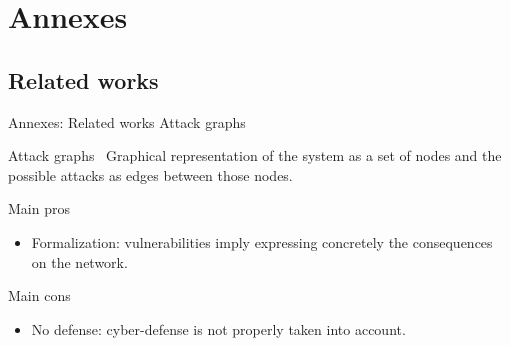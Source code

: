 \section{Annexes}
 
	\subsection{Related works}
 
	\begin{frame}{Annexes: Related works}
		{Attack graphs}

            \begin{block}{Attack graphs~\cite{CPhilips1998}}
                Graphical representation of the system as a set of nodes and the possible attacks as edges between those nodes.
            \end{block}

            \begin{prosblock}{Main pros}
                \begin{itemize}
                    \item Formalization: vulnerabilities imply expressing concretely the consequences on the network.
                \end{itemize}
            \end{prosblock}

            \begin{consblock}{Main cons}
                \begin{itemize}
                    \item No defense: cyber-defense is not properly taken into account.
                \end{itemize}
            \end{consblock}
 
	\end{frame}

